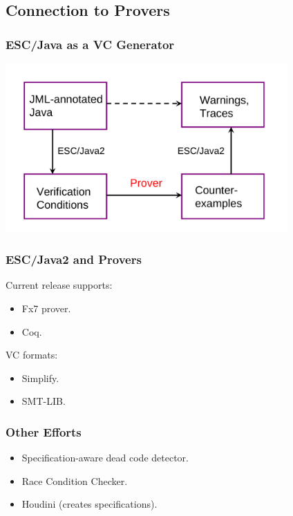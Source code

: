\subsection[Provers]{Connection to Provers}

\begin{frame}
\frametitle{ESC/Java as a VC Generator}
\includegraphics[width=4.25in]{escarch}
\end{frame}

\begin{frame}
\frametitle{ESC/Java2 and Provers}
Current release supports:
\begin{itemize}
\item
Fx7 prover.

\item
Coq.
\end{itemize}

VC formats:
\begin{itemize}
\item
Simplify.

\item
SMT-LIB.
\end{itemize}
\end{frame}

\begin{frame}
\frametitle{Other Efforts}
\begin{itemize}
\item
Specification-aware dead code detector.

\item
Race Condition Checker.

\item
Houdini (creates specifications).
\end{itemize}
\end{frame}

